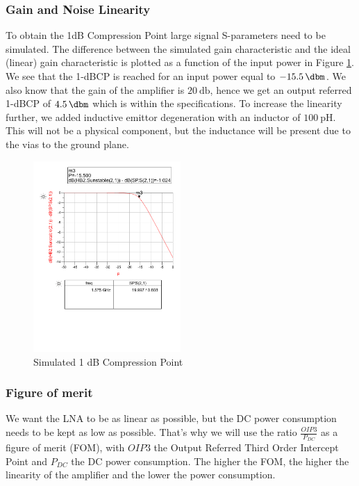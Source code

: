 \documentclass[a4paper]{article}        %
\begin{document}
		\subsubsection{Gain and Noise Linearity}

			To obtain the 1dB Compression Point large signal S-parameters need to be simulated. The difference between the simulated gain characteristic and the ideal (linear) gain characteristic is plotted as a function of the input power in Figure \ref{fig:lna_1dbcp}. We see that the 1-dBCP is reached for an input power equal to $\SI{-15.5}{\dbm}$. We also know that the gain of the amplifier is $\SI{20}{\decibel}$, hence we get an output referred 1-dBCP of $\SI{4.5}{\dbm}$ which is within the specifications. To increase the linearity further, we added inductive emittor degeneration with an inductor of $\SI{100}{\pico\henry}$. This will not be a physical component, but the inductance will be present due to the vias to the ground plane. 

			\begin{figure}[H]
			\centering
				\includegraphics[width=0.5\textwidth]{fig/LNA/compression_point.pdf}
			\caption{Simulated 1 dB Compression Point}
			\label{fig:lna_1dbcp}
			\end{figure}

		\subsubsection{Figure of merit}
			We want the LNA to be as linear as possible, but the DC power consumption needs to be kept as low as possible. That's why we will use the ratio $\frac{OIP3}{P_{DC}}$ as a figure of merit (FOM), with $OIP3$ the Output Referred Third Order Intercept Point and $P_{DC}$ the DC power consumption. The higher the FOM, the higher the linearity of the amplifier and the lower the power consumption. \\
\end{document}
